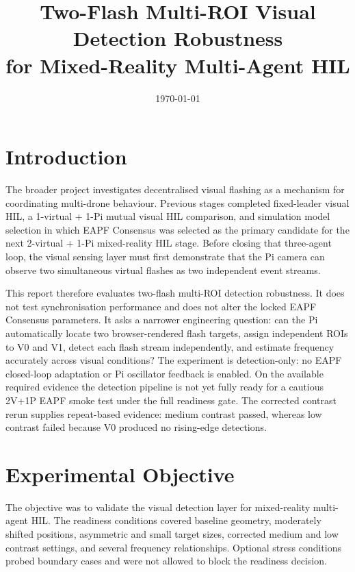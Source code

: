 \documentclass[11pt,a4paper]{article}
\title{Two-Flash Multi-ROI Visual Detection Robustness\\for Mixed-Reality Multi-Agent HIL}
\date{\today}
\begin{document}
\maketitle

\FloatBarrier

\section{Introduction}

The broader project investigates decentralised visual flashing as a mechanism
for coordinating multi-drone behaviour. Previous stages completed fixed-leader
visual HIL, a 1-virtual + 1-Pi mutual visual HIL comparison, and simulation
model selection in which EAPF Consensus was selected as the primary candidate
for the next 2-virtual + 1-Pi mixed-reality HIL stage. Before closing that
three-agent loop, the visual sensing layer must first demonstrate that the Pi
camera can observe two simultaneous virtual flashes as two independent event
streams.

This report therefore evaluates two-flash multi-ROI detection robustness. It
does not test synchronisation performance and does not alter the locked EAPF
Consensus parameters. It asks a narrower engineering question: can the Pi
automatically locate two browser-rendered flash targets, assign independent
ROIs to V0 and V1, detect each flash stream independently, and estimate
frequency accurately across visual conditions? The experiment is detection-only:
no EAPF closed-loop adaptation or Pi oscillator feedback is enabled. On the
available required evidence the detection pipeline is not yet fully ready for a
cautious 2V+1P EAPF smoke test under the full readiness gate. The corrected
contrast rerun supplies repeat-based evidence: medium contrast passed, whereas
low contrast failed because V0 produced no rising-edge detections.

\section{Experimental Objective}

The objective was to validate the visual detection layer for mixed-reality
multi-agent HIL. The readiness conditions covered baseline geometry,
moderately shifted positions, asymmetric and small target sizes, corrected
medium and low contrast settings, and several frequency relationships. Optional
stress conditions probed boundary cases and were not allowed to block the
readiness decision.
\end{document}
